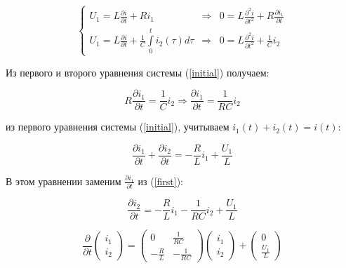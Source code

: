 \documentclass[a4paper,12pt]{article}
\begin{document}
\begin{equation}
\left\{
\begin{array}{lll}
U_1 = L\frac{\partial i}{\partial t} + R i_1 & \Rightarrow & 0 = L\frac{\partial^2 i}{\partial t^2} + R \frac{\partial i_1}{\partial t} \\
	U_1 = L\frac{\partial i}{\partial t} + \frac{1}{C}\int\limits_0^t i_2(\tau) d\tau & \Rightarrow & 0 = L\frac{\partial^2 i}{\partial t^2} + \frac{1}{C} i_2
\end{array}
\right.
\label{initial}
\end{equation}

Из первого и второго уравнения системы (\ref{initial}) получаем:

\begin{equation}
R\frac{\partial i_1}{\partial t} = \frac{1}{C} i_2 \Rightarrow \frac{\partial i_1}{\partial t} = \frac{1}{RC} i_2 
\label{first}
\end{equation}

из первого уравнения системы (\ref{initial}), учитываем $i_1(t) + i_2(t) = i(t)$:

$$
\frac{\partial i_1}{\partial t} + \frac{\partial i_2}{\partial t} = -\frac{R}{L} i_1 + \frac{U_1}{L} 
$$










В этом уравнении заменим $\frac{\partial i_1}{\partial t}$ из (\ref{first}):

$$
\frac{\partial i_2}{\partial t} = - \frac{R}{L} i_1 - \frac{1}{RC} i_2 + \frac{U_1}{L}
$$

\begin{equation}
\frac{\partial}{\partial t}\!\left(\begin{array}{c}i_1\\[1.5mm]i_2\end{array}\right) =
	\left(\begin{array}{cc}0&\frac{1}{RC}\\[1.5mm] -\frac{R}{L}&-\frac{1}{RC}\end{array}\right)
		\left(\begin{array}{c}i_1\\[1.5mm]i_2\end{array}\right)
		+
	\left(\begin{array}{c}0\\[1.5mm]\frac{U_1}{L}\end{array}\right)
\end{equation}
\end{document}
